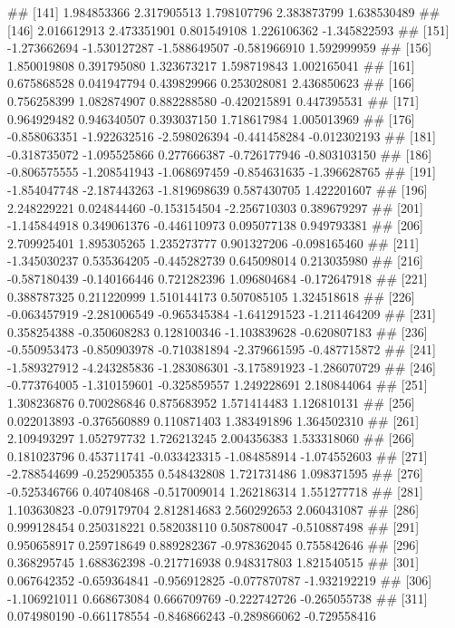 \documentclass[
]{article}
\begin{document}
\begin{enumerate}[label=(\alph*)]
##  [141]  1.984853366  2.317905513  1.798107796  2.383873799  1.638530489
##  [146]  2.016612913  2.473351901  0.801549108  1.226106362 -1.345822593
##  [151] -1.273662694 -1.530127287 -1.588649507 -0.581966910  1.592999959
##  [156]  1.850019808  0.391795080  1.323673217  1.598719843  1.002165041
##  [161]  0.675868528  0.041947794  0.439829966  0.253028081  2.436850623
##  [166]  0.756258399  1.082874907  0.882288580 -0.420215891  0.447395531
##  [171]  0.964929482  0.946340507  0.393037150  1.718617984  1.005013969
##  [176] -0.858063351 -1.922632516 -2.598026394 -0.441458284 -0.012302193
##  [181] -0.318735072 -1.095525866  0.277666387 -0.726177946 -0.803103150
##  [186] -0.806575555 -1.208541943 -1.068697459 -0.854631635 -1.396628765
##  [191] -1.854047748 -2.187443263 -1.819698639  0.587430705  1.422201607
##  [196]  2.248229221  0.024844460 -0.153154504 -2.256710303  0.389679297
##  [201] -1.145844918  0.349061376 -0.446110973  0.095077138  0.949793381
##  [206]  2.709925401  1.895305265  1.235273777  0.901327206 -0.098165460
##  [211] -1.345030237  0.535364205 -0.445282739  0.645098014  0.213035980
##  [216] -0.587180439 -0.140166446  0.721282396  1.096804684 -0.172647918
##  [221]  0.388787325  0.211220999  1.510144173  0.507085105  1.324518618
##  [226] -0.063457919 -2.281006549 -0.965345384 -1.641291523 -1.211464209
##  [231]  0.358254388 -0.350608283  0.128100346 -1.103839628 -0.620807183
##  [236] -0.550953473 -0.850903978 -0.710381894 -2.379661595 -0.487715872
##  [241] -1.589327912 -4.243285836 -1.283086301 -3.175891923 -1.286070729
##  [246] -0.773764005 -1.310159601 -0.325859557  1.249228691  2.180844064
##  [251]  1.308236876  0.700286846  0.875683952  1.571414483  1.126810131
##  [256]  0.022013893 -0.376560889  0.110871403  1.383491896  1.364502310
##  [261]  2.109493297  1.052797732  1.726213245  2.004356383  1.533318060
##  [266]  0.181023796  0.453711741 -0.033423315 -1.084858914 -1.074552603
##  [271] -2.788544699 -0.252905355  0.548432808  1.721731486  1.098371595
##  [276] -0.525346766  0.407408468 -0.517009014  1.262186314  1.551277718
##  [281]  1.103630823 -0.079179704  2.812814683  2.560292653  2.060431087
##  [286]  0.999128454  0.250318221  0.582038110  0.508780047 -0.510887498
##  [291]  0.950658917  0.259718649  0.889282367 -0.978362045  0.755842646
##  [296]  0.368295745  1.688362398 -0.217716938  0.948317803  1.821540515
##  [301]  0.067642352 -0.659364841 -0.956912825 -0.077870787 -1.932192219
##  [306] -1.106921011  0.668673084  0.666709769 -0.222742726 -0.265055738
##  [311]  0.074980190 -0.661178554 -0.846866243 -0.289866062 -0.729558416

\end{enumerate}
\end{document}

